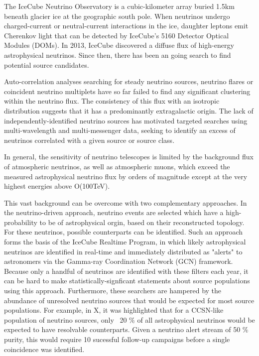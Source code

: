 \documentclass[]{article}
\begin{document}
	The IceCube Neutrino Observatory is a cubic-kilometer array buried 1.5km beneath glacier ice at the geographic south pole. When neutrinos undergo charged-current  or neutral-current interactions in the ice, daughter leptons emit Cherenkov light that can be detected by IceCube's 5160 Detector Optical Modules (DOMs). 
	In 2013, IceCube discovered a diffuse flux of high-energy astrophysical neutrinos. Since then, there has been an going search to find potential source candidates. 
	
	Auto-correlation analyses searching for steady neutrino sources, neutrino flares or coincident neutrino multiplets have so far failed to find any significant clustering within the neutrino flux. The consistency of this flux with an isotropic distribution suggests that it has a predominantly extragalactic origin. The lack of independently-identified neutrino sources has motivated targeted searches using multi-wavelength and multi-messenger data, seeking to identify an excess of neutrinos correlated with a given source or source class.
	
	In general, the sensitivity of neutrino telescopes is limited by the background flux of atmospheric neutrinos, as well as atmospheric muons, which exceed the measured astrophysical neutrino flux by orders of magnitude except at the very highest energies above O(100TeV). 
	
	This vast background can be overcome with two complementary approaches. In the neutrino-driven approach, neutrino events are selected which have a high-probability to be of astrophysical orgin, based on their reconstructed topology. For these neutrinos, possible counterparts can be identified. Such an approach forms the basis of the IceCube Realtime Program, in which likely astrophysical neutrinos are identified in real-time and immediately distributed as "alerts" to astronomers via the Gamma-ray Coordination Network (GCN) framework. Because only a handful of neutrinos are identified with these filters each year, it can be hard to make statistically-signficant statements about source populations using this approach. Furthermore, these searchers are hampered by the abundance of unresolved neutrino sources that would be expected for most source populations. For example, in X, it was highlighted that for a CCSN-like population of neutrino sources, only ~20 \% of all astrophysical neutrinos would be expected to have resolvable counterparts. Given a neutrino alert stream of 50 \% purity, this would require 10 sucessful follow-up campaigns before a single coincidence was identified.
	
\end{document}
